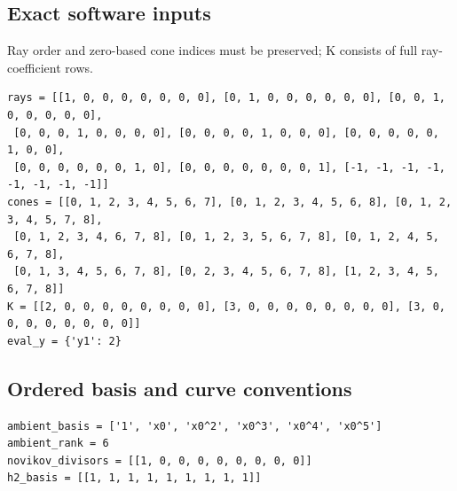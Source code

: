 \documentclass[10pt,a4paper]{article}
\begin{document}
\subsection*{Exact software inputs}
Ray order and zero-based cone indices must be preserved; K consists of full ray-coefficient rows.
\begin{lstlisting}
rays = [[1, 0, 0, 0, 0, 0, 0, 0], [0, 1, 0, 0, 0, 0, 0, 0], [0, 0, 1, 0, 0, 0, 0, 0],
 [0, 0, 0, 1, 0, 0, 0, 0], [0, 0, 0, 0, 1, 0, 0, 0], [0, 0, 0, 0, 0, 1, 0, 0],
 [0, 0, 0, 0, 0, 0, 1, 0], [0, 0, 0, 0, 0, 0, 0, 1], [-1, -1, -1, -1, -1, -1, -1, -1]]
cones = [[0, 1, 2, 3, 4, 5, 6, 7], [0, 1, 2, 3, 4, 5, 6, 8], [0, 1, 2, 3, 4, 5, 7, 8],
 [0, 1, 2, 3, 4, 6, 7, 8], [0, 1, 2, 3, 5, 6, 7, 8], [0, 1, 2, 4, 5, 6, 7, 8],
 [0, 1, 3, 4, 5, 6, 7, 8], [0, 2, 3, 4, 5, 6, 7, 8], [1, 2, 3, 4, 5, 6, 7, 8]]
K = [[2, 0, 0, 0, 0, 0, 0, 0, 0], [3, 0, 0, 0, 0, 0, 0, 0, 0], [3, 0, 0, 0, 0, 0, 0, 0, 0]]
eval_y = {'y1': 2}
\end{lstlisting}
\subsection*{Ordered basis and curve conventions}
\begin{lstlisting}
ambient_basis = ['1', 'x0', 'x0^2', 'x0^3', 'x0^4', 'x0^5']
ambient_rank = 6
novikov_divisors = [[1, 0, 0, 0, 0, 0, 0, 0, 0]]
h2_basis = [[1, 1, 1, 1, 1, 1, 1, 1, 1]]
\end{lstlisting}
\end{document}

